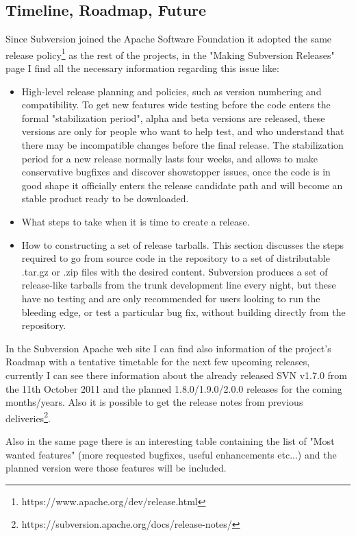 \documentclass[a4paper,10pt]{article}
\begin{document}
\subsection{Timeline, Roadmap, Future}

Since Subversion joined the Apache Software Foundation it adopted the same
release policy\footnote{https://www.apache.org/dev/release.html} as the rest of
the projects, in the "Making Subversion Releases" page\cite{SVNreleases} I find
all the necessary information regarding this issue like:

\begin{itemize}
\item High-level release planning and policies, such as version numbering and
compatibility. To get new features wide testing before the code enters the
formal "stabilization period", alpha and beta versions are released, these
versions are only for people who want to help test, and who understand that
there may be incompatible changes before the final release. The stabilization
period for a new release normally lasts four weeks, and allows to make
conservative bugfixes and discover showstopper issues, once the code is in good
shape it officially enters the release candidate path and will become an stable
product ready to be downloaded.
\item What steps to take when it is time to create a release. 
\item How to constructing a set of release tarballs. This section discusses the
steps required to go from source code in the repository to a set of
distributable .tar.gz or .zip files with the desired content. Subversion
produces a set of release-like tarballs from the trunk development line every
night, but these have no testing and are only recommended for users looking to
run the bleeding edge, or test a particular bug fix, without building directly
from the repository.
\end{itemize}

In the Subversion Apache web site I can find also information of the project's
Roadmap\cite{SVNroadmap} with a tentative timetable for the next few upcoming
releases, currently I can see there information about the already released SVN
v1.7.0 from the 11th October 2011 and the planned 1.8.0/1.9.0/2.0.0 releases for
the coming months/years. Also it is possible to get the release notes from
previous deliveries\footnote{https://subversion.apache.org/docs/release-notes/}.

Also in the same page there is an interesting table containing the list of "Most
wanted features" (more requested bugfixes, useful enhancements etc...) and the
planned version were those features will be included.
 
\end{document}
